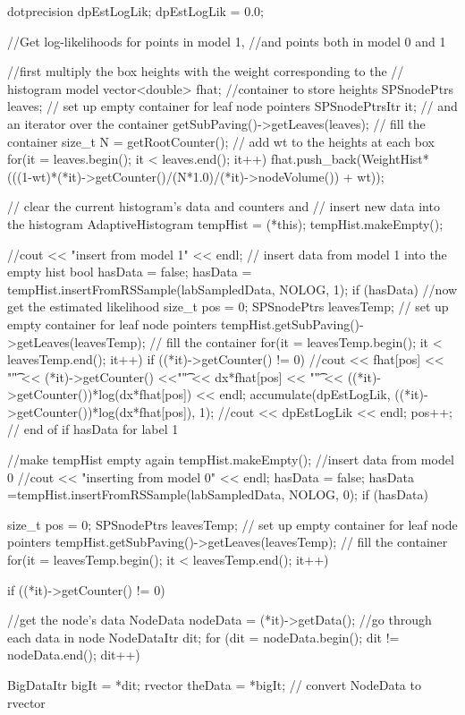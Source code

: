 \begin{DoxyCode}
{
    dotprecision dpEstLogLik;
    dpEstLogLik = 0.0;
      
    //Get log-likelihoods for points in model 1, 
    //and points both in model 0 and 1
    
    //first multiply the box heights with the weight corresponding to the
    // histogram model
    vector<double> fhat; //container to store heights
    SPSnodePtrs leaves; // set up empty container for leaf node pointers
      SPSnodePtrsItr it; // and an iterator over the container
      getSubPaving()->getLeaves(leaves); // fill the container
      size_t N = getRootCounter();
    // add wt to the heights at each box
    for(it = leaves.begin(); it < leaves.end(); it++) {
      fhat.push_back(WeightHist*
      (((1-wt)*(*it)->getCounter()/(N*1.0)/(*it)->nodeVolume()) + wt));
    }
    
    
    // clear the current histogram's data and counters and 
    // insert new data into the histogram 
    AdaptiveHistogram tempHist = (*this);
    tempHist.makeEmpty(); 
    
    //cout << "insert from model 1" << endl;    
    // insert data from model 1 into the empty hist 
     bool hasData = false;
    hasData = tempHist.insertFromRSSample(labSampledData, NOLOG, 1);
    if (hasData) {
      //now get the estimated likelihood
      size_t pos = 0;
      SPSnodePtrs leavesTemp; // set up empty container for leaf node pointers
      tempHist.getSubPaving()->getLeaves(leavesTemp); // fill the container
      for(it = leavesTemp.begin(); it < leavesTemp.end(); it++) {
        if ((*it)->getCounter() != 0) {       
          //cout << fhat[pos] << "\t" << (*it)->getCounter() <<"\t" <<
       dx*fhat[pos] << "\t" << ((*it)->getCounter())*log(dx*fhat[pos]) << endl;
          accumulate(dpEstLogLik, ((*it)->getCounter())*log(dx*fhat[pos]), 1);
          //cout << dpEstLogLik << endl;
        }
        pos++; 
      }   
    } // end of if hasData for label 1
    
    //make tempHist empty again
    tempHist.makeEmpty();
    //insert data from model 0
    //cout << "inserting from model 0" << endl;
    hasData = false;
    hasData =tempHist.insertFromRSSample(labSampledData, NOLOG, 0);
     if (hasData) {
       size_t pos = 0;
      SPSnodePtrs leavesTemp; // set up empty container for leaf node pointers
      tempHist.getSubPaving()->getLeaves(leavesTemp); // fill the container
      for(it = leavesTemp.begin(); it < leavesTemp.end(); it++) {
        if ((*it)->getCounter() != 0) {       
          //get the node's data
          NodeData nodeData = (*it)->getData();
          //go through each data in node
          NodeDataItr dit;
          for (dit = nodeData.begin(); dit != nodeData.end(); dit++){
            BigDataItr bigIt = *dit; 
                  rvector theData = *bigIt;  // convert NodeData to rvector
            
}}}}}
\end{DoxyCode}
